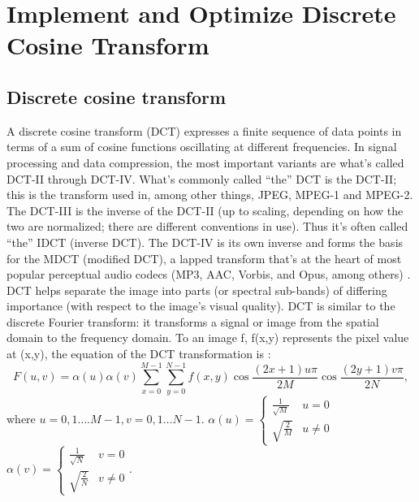\documentclass[a4paper,12pt,twoside]{article}
\begin{document}
\newpage
\section{Implement and Optimize Discrete Cosine Transform}\label{S3}
\subsection{Discrete cosine transform}\label{dctintro}
A discrete cosine transform (DCT) expresses a finite sequence of data points in terms of a sum of cosine functions oscillating at different frequencies\cite{enwiki:1113261571}. In signal processing and data compression, the most important variants are what’s called DCT-II through DCT-IV. What’s commonly called “the” DCT is the DCT-II; this is the transform used in, among other things, JPEG, MPEG-1 and MPEG-2. The DCT-III is the inverse of the DCT-II (up to scaling, depending on how the two are normalized; there are different conventions in use). Thus it’s often called “the” IDCT (inverse DCT). The DCT-IV is its own inverse and forms the basis for the MDCT (modified DCT), a lapped transform that’s at the heart of most popular perceptual audio codecs (MP3, AAC, Vorbis, and Opus, among others) \cite{ryg}. DCT helps separate the image into parts (or spectral sub-bands) of differing importance (with respect to the image’s visual quality). DCT is similar to the discrete Fourier transform: it transforms a signal or image from the spatial domain to the frequency domain. To an image f, f(x,y) represents the pixel value at (x,y), the equation of the DCT transformation is \cite{488}:
\begin{equation}
    F(u,v)=\alpha(u)\alpha(v)\sum_{x=0}^{M-1}{\sum_{y=0}^{N-1}{f(x,y)\cos{\frac{(2x+1)u\pi}{2M}}\cos{\frac{(2y+1)v\pi}{2N}}}},
\end{equation}
where $u=0,1\dots.M-1,v=0,1\dots N-1$. $\alpha(u)=\left\{\begin{array}{ll}\frac{1}{\sqrt{M}}&u=0\\\sqrt{\frac{2}{M}}&u\neq0\end{array}\right.$ $\alpha(v)=\left\{\begin{array}{ll}\frac{1}{\sqrt{N}}&v=0\\\sqrt{\frac{2}{N}}&v\neq0\end{array}\right.$.
\end{document}
